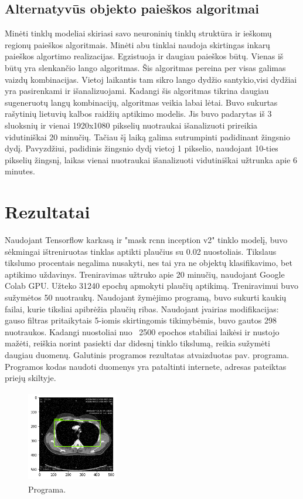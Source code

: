 \documentclass{VUMIFInfKursinis}
\begin{document}
\subsection{Alternatyvūs objekto paieškos algoritmai}
\par
Minėti tinklų modeliai skiriasi savo neuroninių tinklų struktūra ir ieškomų regionų
paieškos algoritmais. Minėti abu tinklai naudoja skirtingas inkarų paieškos algortimo
realizacijas. Egzistuoja ir daugiau paieškos būtų. Vienas iš būtų yra slenkančio lango
algoritmas. Šis algoritmas pereina per visas galimas vaizdų kombinacijas. Vietoj
laikantis tam sikro lango dydžio santykio,visi dydžiai yra pasirenkami ir išanalizuojami.
Kadangi šis algoritmas tikrina daugiau sugeneruotų langų kombinacijų, algoritmas veikia labai lėtai.
Buvo sukurtas rašytinių lietuvių kalbos raidžių aptikimo modelis. Jis buvo padarytas iš 3 sluoksnių
ir vienai 1920x1080 pikselių nuotraukai išanalizuoti prireikia vidutiniškai 20 minučių. Tačiau
šį laiką galima sutrumpinti padidinant žingsnio dydį. Pavyzdžiui, padidinis žingsnio dydį vietoj
1 pikselio, naudojant 10-ties pikselių žingsnį, laikas vienai nuotraukai išanalizuoti
vidutiniškai užtrunka apie 6 minutes.



\section{Rezultatai}
\par
Naudojant Tensorflow karkasą ir "mask rcnn inception v2" tinklo modelį, buvo sėkmingai
ištreniruotas tinklas aptikti plaučius su 0.02 nuostoliais.
Tikslaus tikslumo procentais negalima nusakyti, nes tai yra ne objektų klasifikavimo,
bet aptikimo uždavinys.
Treniravimas užtruko apie 20 minučių,
naudojant Google Colab GPU. Užteko 31240 epochų apmokyti plaučių aptikimą.
Treniravimui buvo sužymėtos 50 nuotraukų. Naudojant žymėjimo programą, buvo sukurti kaukių
failai, kurie tiksliai apibrėžia plaučių ribas. Naudojant įvairias modifikacijas:
gauso filtras pritaikytais 5-iomis skirtingomis tikimybėmis, buvo gautos 298 nuotraukos.
Kadangi nuostoliai nuo ~2500 epochos stabiliai laikėsi ir nustojo mažėti, reiškia norint
pasiekti dar didesnį tinklo tikslumą, reikia sužymėti daugiau duomenų.
Galutinis programos rezultatas atvaizduotas pav. programa. Programos kodas naudoti
duomenys yra pataltinti internete, adresas pateiktas priejų skiltyje.

\begin{figure}[ht]
  \includegraphics[width=4cm,height=4cm,keepaspectratio]{result1.png}
  \caption{Programa.}
  \label{fig:kaukė1}
\end{figure}
\end{document}
